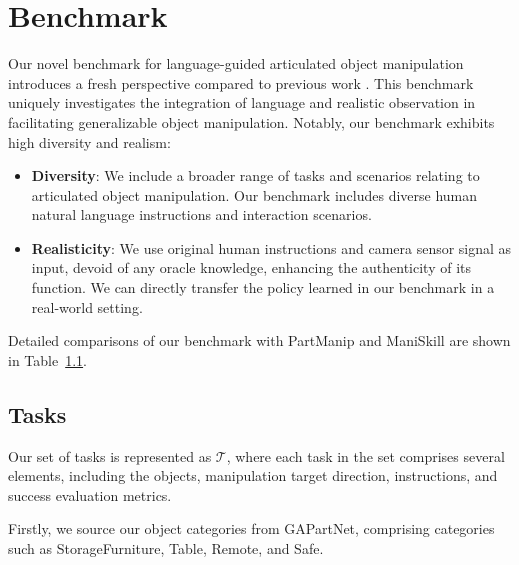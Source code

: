 \section{Benchmark}

Our novel benchmark for language-guided articulated object manipulation introduces a fresh perspective compared to previous work \cite{geng2023partmanip, mu2021maniskill}. This benchmark uniquely investigates the integration of language and realistic observation in facilitating generalizable object manipulation.
%
Notably, our benchmark exhibits high diversity and realism:
\begin{itemize}
    \item \textbf{Diversity}: We include a broader range of tasks and scenarios relating to articulated object manipulation. Our benchmark includes diverse human natural language instructions and interaction scenarios.
    \item \textbf{Realisticity}: We use original human instructions and camera sensor signal as input, devoid of any oracle knowledge, enhancing the authenticity of its function. We can directly transfer the policy learned in our benchmark in a real-world setting.
\end{itemize}
Detailed comparisons of our benchmark with PartManip\cite{geng2023partmanip} and ManiSkill\cite{mu2021maniskill} are shown in Table~\ref{}. 


\subsection{Tasks}
Our set of tasks is represented as $\mathcal{T}$, where each task in the set comprises several elements, including the objects, manipulation target direction, instructions, and success evaluation metrics.

Firstly, we source our object categories from GAPartNet\cite{geng2022gapartnet}, comprising  categories such as StorageFurniture, Table, Remote, and Safe.

